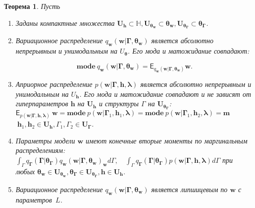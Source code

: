 \documentclass[12pt, twoside]{article}
\newtheorem{theorem}{Теорема}
\begin{document}
\begin{theorem}
Пусть
\begin{enumerate}
\item Заданы компактные множества $\mathbf{U}_{\mathbf{h}} \subset \mathbb{H}, \mathbf{U}_{\bm{\theta}_{\mathbf{w}}} \subset \bm{\theta}_{\mathbf{w}}, \mathbf{U}_{\bm{\theta}_{\bm{\Gamma}}} \subset \bm{\theta}_{\bm{\Gamma}}$.

\item Вариационное распределение $q_{\mathbf{w}}\left(\mathbf{w}|\bm{\Gamma}, \bm{\theta}_{\mathbf{w}}\right)$  является абсолютно непрерывным и унимодальным на  $U_{\bm{\theta}}$.
Его мода и матожидание совпадают:

\[
  \textbf{mode}~q_{\mathbf{w}}\left(\mathbf{w}|\bm{\Gamma}, \bm{\theta}_{\mathbf{w}}\right)= \mathsf{E}_{q_{\mathbf{w}}\left(\mathbf{w}|\bm{\Gamma}, \bm{\theta}_{\mathbf{w}}\right)} \mathbf{w}.
\]




\item Априорное распределение $p\left(\mathbf{w}|\bm{\Gamma}, \mathbf{h}, \bm{\lambda}\right)$ является абсолютно непрерывным и унимодальным на  $U_\mathbf{h}$. Его мода и матожидание совпадают и не зависят от гиперпараметров $\mathbf{h}$  на $\mathbf{U}_{\mathbf{h}}$ и структуры $\Gamma$ на $\mathbf{U}_{\bm{\theta}_{\bm{\Gamma}}}$:
$
\mathsf{E}_{p\left(\mathbf{w}|\bm{\Gamma}, \mathbf{h}, \bm{\lambda}\right)}~\mathbf{w} = \textbf{mode}~p\left(\mathbf{w}|\bm{\Gamma}_1, \mathbf{h}_1, \bm{\lambda}\right)=\textbf{mode}~p\left(\mathbf{w}|\bm{\Gamma}_1, \mathbf{h}_2, \bm{\lambda}\right)=\mathbf{m}
$
$~\mathbf{h}_1,\mathbf{h}_2 \in \mathbf{U}_{\mathbf{h}}, \Gamma_1,\Gamma_2 \in \mathbf{U}_{\bm{\Gamma}}$.


\item Параметры модели $\mathbf{w}$ имеют конечные вторые моменты по маргинальным распределениям:
$
   \int_{\Gamma}q_{\bm{\Gamma}}\left(\bm{\Gamma}|\bm{\theta}_{\bm{\Gamma}}\right)q_{\mathbf{w}}\left(\mathbf{w}|\bm{\Gamma}, \bm{\theta}_{\mathbf{w}}\right)_{\mathbf{w}} d\Gamma, \quad \int_{\Gamma}q_{\bm{\Gamma}}\left(\bm{\Gamma}|\bm{\theta}_{\bm{\Gamma}}\right)p\left(\mathbf{w}|\bm{\Gamma}, \mathbf{h}, \bm{\lambda}\right) d\Gamma
$
при любых $\bm{\theta}_{\mathbf{w}}\in \mathbf{U}_{\bm{\theta}_{\mathbf{w}}}, \bm{\theta}_{\bm{\Gamma}} \in \mathbf{U}_{\bm{\theta}_{\bm{\Gamma}}}, \mathbf{h} \in \mathbf{U}_{\mathbf{h}}.$


\item Вариационное распределение $q_{\mathbf{w}}\left(\mathbf{w}|\bm{\Gamma}, \bm{\theta}_{\mathbf{w}}\right)$ является липшицевым по $\mathbf{w}$ с параметров~$L$.


\end{enumerate}
\end{theorem}
\end{document}
